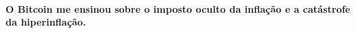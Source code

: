 \paragraph{O Bitcoin me ensinou sobre o imposto oculto da inflação e a catástrofe da hiperinflação.}

%
%
%
%
%
